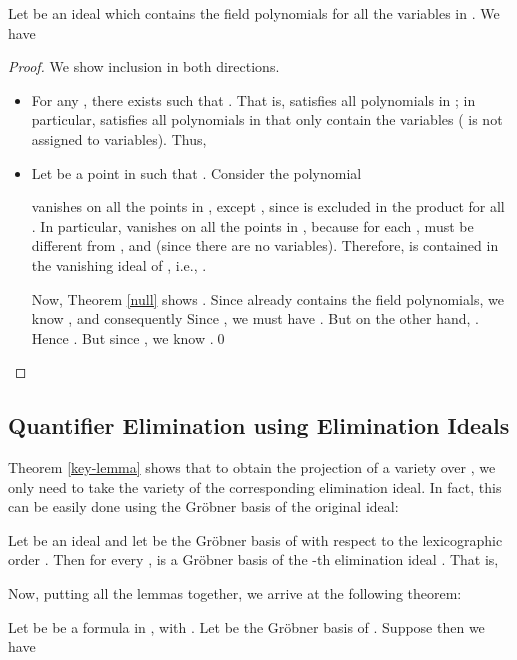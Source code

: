 \documentclass[envcountsect]{llncs}
\begin{document}
\begin{theorem}\label{key-lemma}
Let  be an ideal which contains the field polynomials for all the variables in . We have 
\end{theorem}
\begin{proof} We show inclusion in both directions.
\begin{itemize}
\item  

For any , there exists  such that . That is,  satisfies all polynomials in ; in particular,  satisfies all polynomials in  that only contain the  variables ( is not assigned to variables). Thus, 

\item  

Let  be a point in  such that . Consider the polynomial 

 vanishes on all the points in , except , since  is excluded in the product for all . In particular,  vanishes on all the points in , because for each ,  must be different from , and  (since there are no  variables). Therefore,  is contained in the vanishing ideal of , i.e., .

Now, Theorem \ref{null} shows .
Since  already contains the field polynomials, we know , and consequently  Since , we must have . But on the other hand, . Hence . But since ,  we know .\qed
\end{itemize}
\end{proof}

\subsection{Quantifier Elimination using Elimination Ideals}

Theorem \ref{key-lemma} shows that to obtain the projection of a variety over , we only need to take the variety of the corresponding elimination ideal. In fact, this can be easily done using the Gr\"obner basis of the original ideal:

\begin{proposition}\label{GB}
Let  be an ideal and let  be the Gr\"obner basis of  with respect to the lexicographic order . Then for every ,  is a Gr\"obner basis of the -th elimination ideal . That is, 
\end{proposition}

Now, putting all the lemmas together, we arrive at the following theorem:

\begin{theorem}\label{main-theorem}
Let  be  be a formula in , with . Let  be the Gr\"obner basis of . Suppose  then we have 
\end{theorem}
\end{document}
